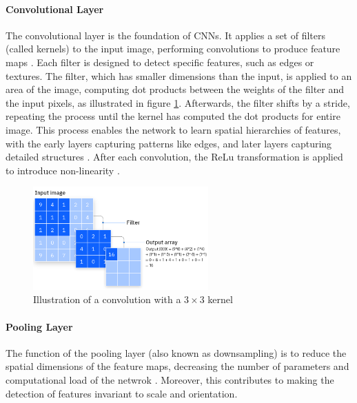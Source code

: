 \paragraph{Convolutional Layer}
The convolutional layer is the foundation of CNNs. It applies a set of filters (called kernels) to the input image, performing convolutions to produce feature maps \cite{cs231n}. Each filter is designed to detect specific features, such as edges or textures. The filter, which has smaller dimensions than the input, is applied to an area of the image, computing dot products between the weights of the filter and the input pixels, as illustrated in figure \ref{fig:convolution}. Afterwards, the filter shifts by a stride, repeating the process until the kernel has computed the dot products for entire image. This process enables the network to learn spatial hierarchies of features, with the early layers capturing patterns like edges, and later layers capturing detailed structures \cite{yosinski2014transferablefeaturesdeepneural}. After each convolution, the ReLu \cite{relu} transformation is applied to introduce non-linearity \cite{cs231n}.

\begin{figure}[ht]
    \centering
    \includegraphics[width=0.6\textwidth]{Images/convolution.png} 
    \caption{Illustration of a convolution with a $3\times 3$ kernel \cite{ibm_cnn}}
    \label{fig:convolution}
\end{figure}

\paragraph{Pooling Layer}
The function of the pooling layer (also known as downsampling) is to reduce the spatial dimensions of the feature maps, decreasing the number of parameters and computational load of the netwrok \cite{cs231n}. Moreover, this contributes to making the detection of features invariant to scale and orientation.  

